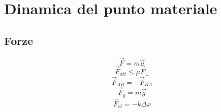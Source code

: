 \documentclass[../../dimostrazioni]{subfiles}
\begin{document}
    \chapter{Dinamica del punto materiale}

        \section*{Forze}
        
            \[ \vec{F} = m \vec{a}  \] %
            \[ \vec{F}_{att} \leq \mu \vec{F}_{\perp}  \]
            \[ \vec{F}_{AB} = - \vec{F}_{BA}  \] %
            \[ \vec{F}_{g} = m \vec{g}  \] %
            \[ \vec{F}_{el} = - k \Delta x  \]
        
\end{document}
